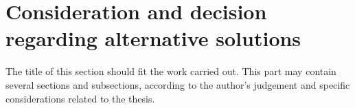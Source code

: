 \chapter{Consideration and decision regarding alternative solutions}

The title of this section should fit the work carried out. This part may contain several sections and subsections, according to the author's judgement and specific considerations related to the thesis.